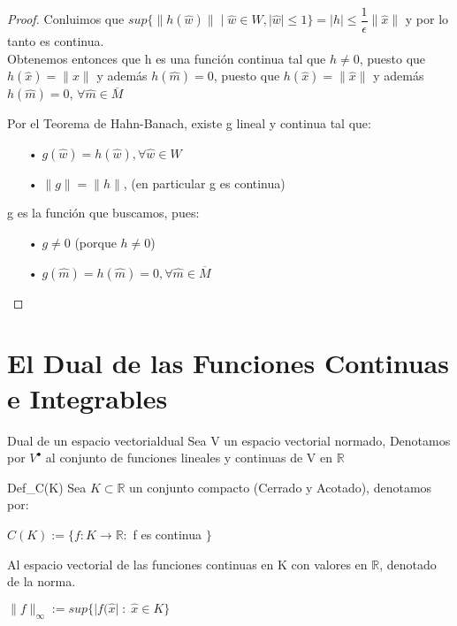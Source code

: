 \documentclass[12pt,a4paper]{book}
\providecommand{\abs}[1]{\lvert#1\rvert}
\providecommand{\norm}[1]{\lVert#1\rVert}
\providecommand{\conj}[1]{\lbrace#1\rbrace}
\begin{document}
\begin{proof}
Conluimos que $sup\conj{\norm{h(\widehat{w})}\;|\; \widehat{w}\in W, \abs{\widehat{w}}\leq 1}=\abs{h}\leq\dfrac{1}{\epsilon}\norm{\widehat{x}}$ y por lo tanto es continua.\\

Obtenemos entonces que h es una función continua tal que $h\neq 0$, puesto que $h(\widehat{x})=\norm{x}$ y además $h(\widehat{m})=0$, puesto que $h(\widehat{x})=\norm{\widehat{x}}$ y además $h(\widehat{m})=0$, $\forall \widehat{m}\in\overline{M}$

Por el Teorema de Hahn-Banach, existe g lineal y continua tal que:
\begin{enumerate}
\item[•] $g(\widehat{w})=h(\widehat{w}), \forall\widehat{w}\in W$ 
\item[•] $\norm{g}=\norm{h}$, (en particular g es continua)
\end{enumerate}
g es la función que buscamos, pues:
\begin{enumerate}
\item[•] $g\neq 0$ (porque $h\neq 0$)
\item[•] $g(\widehat{m})=h(\widehat{m})=0, \forall \widehat{m}\in\overline{M}$
\end{enumerate}
\end{proof}

\section{ El Dual de las Funciones Continuas e Integrables}

\begin{definicion}{Dual de un espacio vectorial}{dual}
Sea V un espacio vectorial normado, Denotamos por $V^{\bullet}$ al conjunto de funciones lineales y continuas de V en $\mathbb{R}$
\end{definicion}
\smallskip

\begin{definicion}{}{Def_C(K)}
Sea $K\subset\mathbb{R}$ un conjunto compacto (Cerrado y Acotado), denotamos por:
\begin{center}
$C(K):=\conj{f:K\rightarrow\mathbb{R}:$ f es continua $}$
\end{center}
Al espacio vectorial de las funciones continuas en K con valores en $\mathbb{R}$, denotado de la norma.
\begin{center}
$\norm{f}_{\infty}:=sup\conj{\abs{f(\widehat{x}}\;:\;\widehat{x}\in K}$
\end{center}
\end{definicion}
\smallskip
\end{document}

